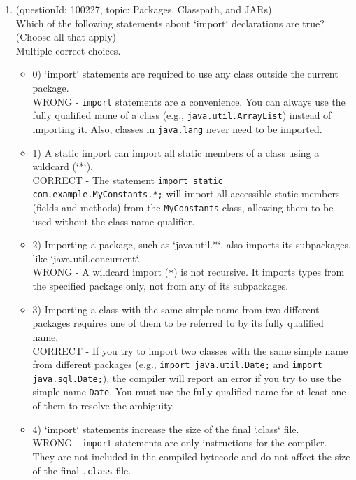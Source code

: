 \documentclass[12pt]{article}
\begin{document}
\begin{enumerate}[label=(\arabic*)]
\begin{itemize}
\end{itemize}
\item (questionId: 100227, topic: Packages, Classpath, and JARs) \\ 
Which of the following statements about `import` declarations are true? (Choose all that apply)
\\ \noindent Multiple correct choices. 
\begin{itemize}
\item 0) `import` statements are required to use any class outside the current package.
 \\ 
WRONG - \verb|import| statements are a convenience. You can always use the fully qualified name of a class (e.g., \verb|java.util.ArrayList|) instead of importing it. Also, classes in \verb|java.lang| never need to be imported.

\item 1) A static import can import all static members of a class using a wildcard (`*`).
 \\ 
CORRECT - The statement \verb|import static com.example.MyConstants.*;| will import all accessible static members (fields and methods) from the \verb|MyConstants| class, allowing them to be used without the class name qualifier.

\item 2) Importing a package, such as `java.util.*`, also imports its subpackages, like `java.util.concurrent`.
 \\ 
WRONG - A wildcard import (\verb|*|) is not recursive. It imports types from the specified package only, not from any of its subpackages.

\item 3) Importing a class with the same simple name from two different packages requires one of them to be referred to by its fully qualified name.
 \\ 
CORRECT - If you try to import two classes with the same simple name from different packages (e.g., \verb|import java.util.Date;| and \verb|import java.sql.Date;|), the compiler will report an error if you try to use the simple name \verb|Date|. You must use the fully qualified name for at least one of them to resolve the ambiguity.

\item 4) `import` statements increase the size of the final `.class` file.
 \\ 
WRONG - \verb|import| statements are only instructions for the compiler. They are not included in the compiled bytecode and do not affect the size of the final \verb|.class| file.


\end{itemize}
\end{enumerate}
\end{document}
